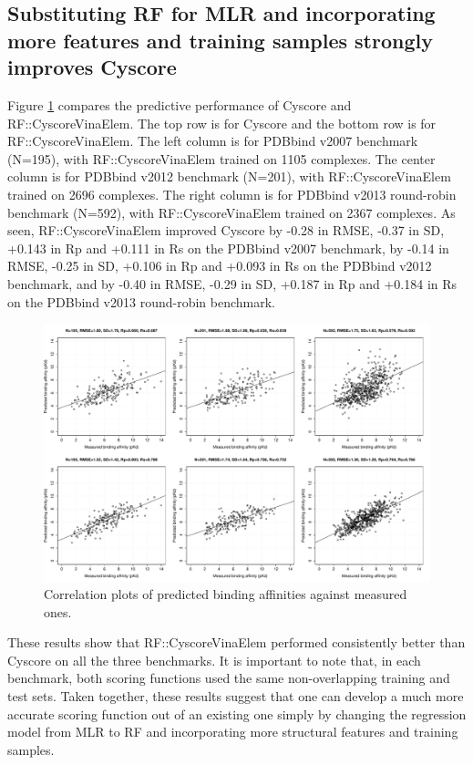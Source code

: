 \subsection{Substituting RF for MLR and incorporating more features and training samples strongly improves Cyscore}

Figure \ref{rfcyscore:cor} compares the predictive performance of Cyscore and RF::CyscoreVinaElem. The top row is for Cyscore and the bottom row is for RF::CyscoreVinaElem. The left column is for PDBbind v2007 benchmark (N=195), with RF::CyscoreVinaElem trained on 1105 complexes. The center column is for PDBbind v2012 benchmark (N=201), with RF::CyscoreVinaElem trained on 2696 complexes. The right column is for PDBbind v2013 round-robin benchmark (N=592), with RF::CyscoreVinaElem trained on 2367 complexes. As seen, RF::CyscoreVinaElem improved Cyscore by -0.28 in RMSE, -0.37 in SD, +0.143 in Rp and +0.111 in Rs on the PDBbind v2007 benchmark, by -0.14 in RMSE, -0.25 in SD, +0.106 in Rp and +0.093 in Rs on the PDBbind v2012 benchmark, and by -0.40 in RMSE, -0.29 in SD, +0.187 in Rp and +0.184 in Rs on the PDBbind v2013 round-robin benchmark.

\begin{figure}
\includegraphics[width=\linewidth]{../rfcyscore/cor.pdf}
\caption{Correlation plots of predicted binding affinities against measured ones.}
\label{rfcyscore:cor}
\end{figure}

These results show that RF::CyscoreVinaElem performed consistently better than Cyscore on all the three benchmarks. It is important to note that, in each benchmark, both scoring functions used the same non-overlapping training and test sets. Taken together, these results suggest that one can develop a much more accurate scoring function out of an existing one simply by changing the regression model from MLR to RF and incorporating more structural features and training samples.

